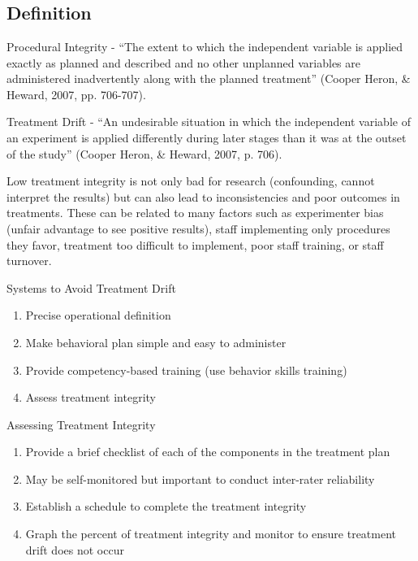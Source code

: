\section[\fourkFive{}]{\fourkFive{}%
              }
\subsection{Definition}
Procedural Integrity - ``The extent to which the independent variable is applied exactly as planned and described and no other unplanned variables are administered inadvertently along with the planned treatment'' (Cooper Heron, \& Heward, 2007, pp. 706-707).

Treatment Drift - ``An undesirable situation in which the independent variable of an experiment is applied differently during later stages than it was at the outset of the study'' (Cooper Heron, \& Heward, 2007, p. 706).

Low treatment integrity is not only bad for research (confounding, cannot interpret the results) but can also lead to inconsistencies and poor outcomes in treatments.  These can be related to many factors such as experimenter bias (unfair advantage to see positive results), staff implementing only procedures they favor, treatment too difficult to implement, poor staff training, or staff turnover.

Systems to Avoid Treatment Drift
\begin{enumerate}
\item Precise operational definition
\item Make behavioral plan simple and easy to administer
\item Provide competency-based training (use behavior skills training)
\item Assess treatment integrity
\end{enumerate}

Assessing Treatment Integrity
\begin{enumerate}
\item Provide a brief checklist of each of the components in the treatment plan
\item May be self-monitored but important to conduct inter-rater reliability
\item Establish a schedule to complete the treatment integrity
\item Graph the percent of treatment integrity and monitor to ensure treatment drift does not occur
\end{enumerate}
%
